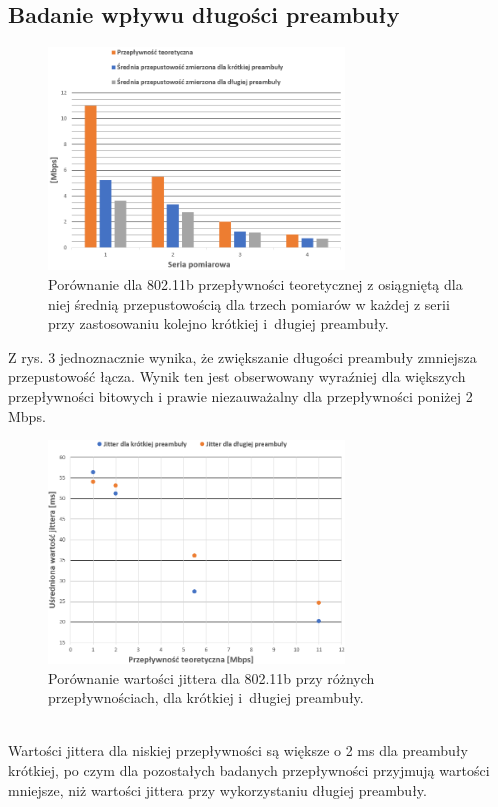 \documentclass[12pt, a4paper, oneside]{article}
\begin{document}
\subsection{Badanie wpływu długości preambuły}
\begin{figure}[h!]
\centering
\includegraphics[width=0.7\textwidth]{pics/f3.png}
\caption{Porównanie dla 802.11b przepływności teoretycznej z osiągniętą dla niej średnią przepustowością dla trzech pomiarów w każdej z serii przy zastosowaniu kolejno krótkiej i~długiej preambuły.}
\end{figure}
\indent Z rys. 3 jednoznacznie wynika, że zwiększanie długości preambuły zmniejsza przepustowość łącza. Wynik ten jest obserwowany wyraźniej dla większych przepływności bitowych i prawie niezauważalny dla przepływności poniżej 2 Mbps.
\begin{figure}[h!]
\centering
\includegraphics[width=0.7\textwidth]{pics/f5.png}
\caption{Porównanie wartości jittera dla 802.11b przy różnych przepływnościach, dla krótkiej i~długiej preambuły.}
\end{figure}\\
\indent Wartości jittera dla niskiej przepływności są większe o 2 ms dla preambuły krótkiej, po czym dla pozostałych badanych przepływności przyjmują wartości mniejsze, niż wartości jittera przy wykorzystaniu długiej preambuły.
\end{document}
